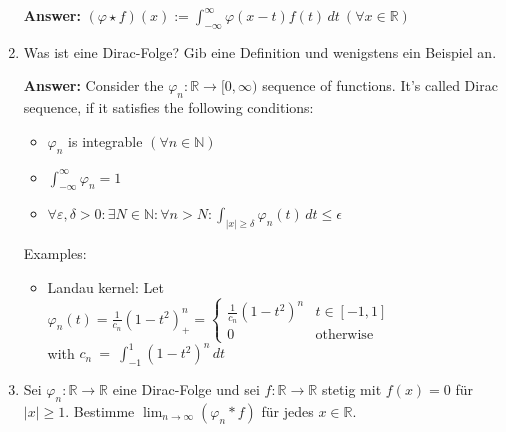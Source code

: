 \documentclass[11pt]{article}
\newcommand{\abs}[1]{\left|#1\right|}
\newcommand{\RR}[0]{\mathbb{R}}
\newcommand{\NN}[0]{\mathbb{N}}
\begin{document}
\begin{enumerate}
    \textbf{Answer:} $(\varphi \star f)(x) := \int_{-\infty}^\infty \varphi(x-t) f(t)\,dt~(\forall x \in \RR)$
    \item Was ist eine Dirac-Folge? Gib eine Definition und wenigstens ein Beispiel an.

    \textbf{Answer:} Consider the $\varphi_n : \RR \to [0, \infty)$ sequence of functions. It's called Dirac sequence, if it satisfies the following conditions:
    \begin{itemize}
        \item $\varphi_n$ is integrable $(\forall n \in \NN)$
        \item $\int_{-\infty}^\infty \varphi_n = 1$
        \item $\forall \varepsilon, \delta > 0 \colon \exists N \in \NN\colon \forall n > N\colon \int_{\abs{x} \ge \delta} \varphi_n(t)\,dt \le \epsilon$
    \end{itemize}

    Examples:
    \begin{itemize}
        \item Landau kernel: Let $\varphi_n(t) = \frac{1}{c_n} (1 - t^2)_+^n = \begin{cases}
            \frac{1}{c_n} (1 - t^2)^n&t \in [-1, 1]\\
            0&\text{otherwise}
        \end{cases}$ \\with $c_n~=~\int_{-1}^1(1-t^2)^n\,dt$
    \end{itemize}

    \item Sei $\varphi_n: \RR \to \RR$ eine Dirac-Folge und sei $f: \RR \to \RR$ stetig mit $f(x) = 0$ für $\abs{x} \ge 1$. Bestimme $\lim_{n\to\infty} (\varphi_n * f)$  für jedes $x \in \RR$.


\end{enumerate}
\end{document}
